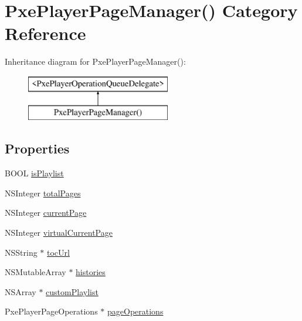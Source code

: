 \hypertarget{category_pxe_player_page_manager_07_08}{\section{Pxe\-Player\-Page\-Manager() Category Reference}
\label{category_pxe_player_page_manager_07_08}
}
Inheritance diagram for Pxe\-Player\-Page\-Manager()\-:\begin{figure}[H]
\begin{center}
\leavevmode
\includegraphics[height=2.000000cm]{category_pxe_player_page_manager_07_08}
\end{center}
\end{figure}
\subsection*{Properties}
\begin{DoxyCompactItemize}
\item 
B\-O\-O\-L \hyperlink{category_pxe_player_page_manager_07_08_a6593a02ae5353431f23a8fd7c74dd256}{is\-Playlist}
\item 
N\-S\-Integer \hyperlink{category_pxe_player_page_manager_07_08_adb201d14e3ca4f38e9ec2065f952c288}{total\-Pages}
\item 
N\-S\-Integer \hyperlink{category_pxe_player_page_manager_07_08_a05c4bdb4a35995cd2323311a4ddd5990}{current\-Page}
\item 
N\-S\-Integer \hyperlink{category_pxe_player_page_manager_07_08_accf769375dab7b61ec6e72229026cb9b}{virtual\-Current\-Page}
\item 
N\-S\-String $\ast$ \hyperlink{category_pxe_player_page_manager_07_08_a30a7e06d49dbb6083d1680e33cbe9935}{toc\-Url}
\item 
N\-S\-Mutable\-Array $\ast$ \hyperlink{category_pxe_player_page_manager_07_08_a67cd80bd4518f3d9f2a13575878543f6}{histories}
\item 
N\-S\-Array $\ast$ \hyperlink{category_pxe_player_page_manager_07_08_ada0666ce9183a61c6523ccd9eaf56382}{custom\-Playlist}
\item 
Pxe\-Player\-Page\-Operations $\ast$ \hyperlink{category_pxe_player_page_manager_07_08_a736f70880c4e6ba6af0bb9a793096333}{page\-Operations}
\end{DoxyCompactItemize}


